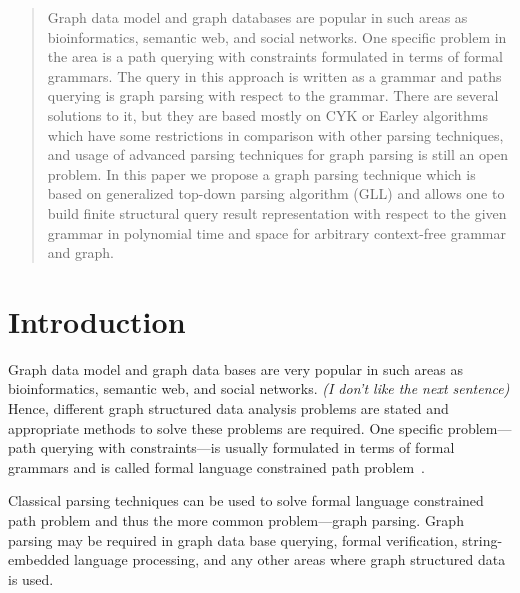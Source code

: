 \documentclass[runningheads,a4paper]{llncs}
\begin{document}
\begin{abstract}
Graph data model and graph databases are popular in such areas as bioinformatics, semantic web, and social networks.
One specific problem in the area is a path querying with constraints formulated in terms of formal grammars.
The query in this approach is written as a grammar and paths querying is graph parsing with respect to the grammar.
There are several solutions to it, but they are based mostly on CYK or Earley algorithms which have some restrictions in comparison with other parsing techniques, and usage of advanced parsing techniques for graph parsing is still an open problem.
In this paper we propose a graph parsing technique which is based on generalized top-down parsing algorithm (GLL) and allows one to build finite structural query result representation with respect to the given grammar in polynomial time and space for arbitrary context-free grammar and graph.


\end{abstract}






\section{Introduction}
Graph data model and graph data bases are very popular in such areas as bioinformatics, semantic web, and social networks.
\emph{(I don't like the next sentence)}
Hence, different graph structured data analysis problems are stated and appropriate methods to solve these problems are required.
One specific problem---path querying with constraints---is usually formulated in terms of formal grammars and is called formal language constrained path problem~\cite{FLCpathProblem}.

Classical parsing techniques can be used to solve formal language constrained path problem and thus the more common problem---graph parsing. 
Graph parsing may be required in graph data base querying, formal verification, string-embedded language processing, and any other areas where graph structured data is used. 
\end{document}
